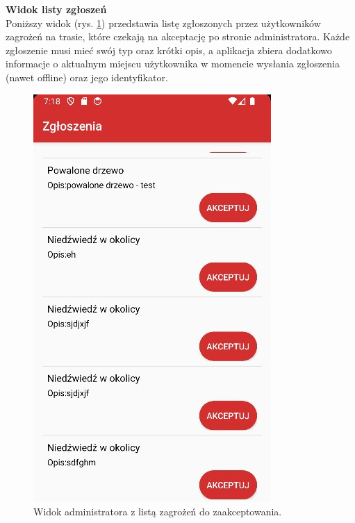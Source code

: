 
\textbf{Widok listy zgłoszeń}\\
\indent Poniższy widok (rys. \ref{widok:adminaccept}) przedstawia listę zgłoszonych przez użytkowników zagrożeń na trasie, które czekają na akceptację po stronie administratora. Każde zgłoszenie musi mieć swój typ oraz krótki opis, a aplikacja zbiera dodatkowo informacje o aktualnym miejscu użytkownika w momencie wysłania zgłoszenia (nawet offline) oraz jego identyfikator.
\begin{figure}[H]
    \centering
    \includegraphics[scale=0.15]{img/test/testzglosadmin.jpg}
    \caption{Widok administratora z listą zagrożeń do zaakceptowania.}
    \label{widok:adminaccept}
\end{figure}

